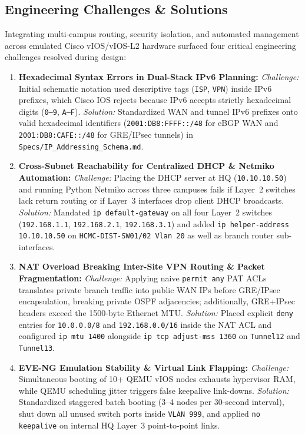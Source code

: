 \subsection{Engineering Challenges \& Solutions}
Integrating multi-campus routing, security isolation, and automated management across emulated Cisco vIOS/vIOS-L2 hardware surfaced four critical engineering challenges resolved during design:
\begin{enumerate}[leftmargin=1.5em, itemsep=3pt]
    \item \textbf{Hexadecimal Syntax Errors in Dual-Stack IPv6 Planning:} \emph{Challenge:} Initial schematic notation used descriptive tags (\texttt{ISP}, \texttt{VPN}) inside IPv6 prefixes, which Cisco IOS rejects because IPv6 accepts strictly hexadecimal digits (\texttt{0--9}, \texttt{A--F}). \emph{Solution:} Standardized WAN and tunnel IPv6 prefixes onto valid hexadecimal identifiers (\texttt{2001:DB8:FFFF::/48} for eBGP WAN and \texttt{2001:DB8:CAFE::/48} for GRE/IPsec tunnels) in \texttt{Specs/IP\_Addressing\_Schema.md}.
    \item \textbf{Cross-Subnet Reachability for Centralized DHCP \& Netmiko Automation:} \emph{Challenge:} Placing the DHCP server at HQ (\texttt{10.10.10.50}) and running Python Netmiko across three campuses fails if Layer~2 switches lack return routing or if Layer~3 interfaces drop client DHCP broadcasts. \emph{Solution:} Mandated \texttt{ip default-gateway} on all four Layer~2 switches (\texttt{192.168.1.1}, \texttt{192.168.2.1}, \texttt{192.168.3.1}) and added \texttt{ip helper-address 10.10.10.50} on \texttt{HCMC-DIST-SW01/02 Vlan 20} as well as branch router sub-interfaces.
    \item \textbf{NAT Overload Breaking Inter-Site VPN Routing \& Packet Fragmentation:} \emph{Challenge:} Applying naive \texttt{permit any} PAT ACLs translates private branch traffic into public WAN IPs before GRE/IPsec encapsulation, breaking private OSPF adjacencies; additionally, GRE+IPsec headers exceed the 1500-byte Ethernet MTU. \emph{Solution:} Placed explicit \texttt{deny} entries for \texttt{10.0.0.0/8} and \texttt{192.168.0.0/16} inside the NAT ACL and configured \texttt{ip mtu 1400} alongside \texttt{ip tcp adjust-mss 1360} on \texttt{Tunnel12} and \texttt{Tunnel13}.
    \item \textbf{EVE-NG Emulation Stability \& Virtual Link Flapping:} \emph{Challenge:} Simultaneous booting of 10+ QEMU vIOS nodes exhausts hypervisor RAM, while QEMU scheduling jitter triggers false keepalive link-downs. \emph{Solution:} Standardized staggered batch booting (3--4 nodes per 30-second interval), shut down all unused switch ports inside \texttt{VLAN 999}, and applied \texttt{no keepalive} on internal HQ Layer~3 point-to-point links.
\end{enumerate}

